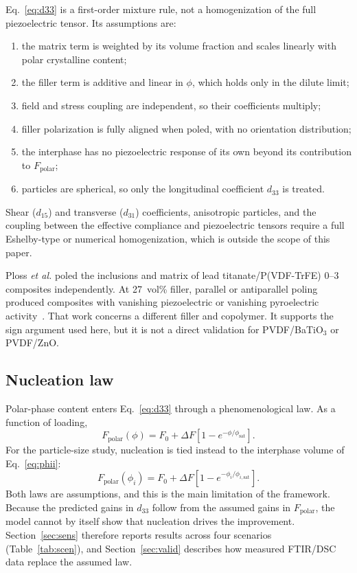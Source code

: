 \documentclass[11pt,a4paper]{article}
\newcommand{\BTO}{BaTiO$_3$}
\newcommand{\dt}{d_{33}}
\newcommand{\Fp}{F_{\mathrm{polar}}}
\begin{document}
Eq.~\eqref{eq:d33} is a first-order mixture rule, not a homogenization of the full piezoelectric tensor. Its assumptions are:
\begin{enumerate}
\item the matrix term is weighted by its volume fraction and scales linearly with polar crystalline content;
\item the filler term is additive and linear in $\phi$, which holds only in the dilute limit;
\item field and stress coupling are independent, so their coefficients multiply;
\item filler polarization is fully aligned when poled, with no orientation distribution;
\item the interphase has no piezoelectric response of its own beyond its contribution to $\Fp$;
\item particles are spherical, so only the longitudinal coefficient $\dt$ is treated.
\end{enumerate}
Shear ($d_{15}$) and transverse ($d_{31}$) coefficients, anisotropic particles, and the coupling between the effective compliance and piezoelectric tensors require a full Eshelby-type or numerical homogenization, which is outside the scope of this paper.

Ploss \emph{et al.} poled the inclusions and matrix of lead titanate/P(VDF-TrFE) 0--3 composites independently. At 27~vol\% filler, parallel or antiparallel poling produced composites with vanishing piezoelectric or vanishing pyroelectric activity~\cite{Ploss2000}. That work concerns a different filler and copolymer. It supports the sign argument used here, but it is not a direct validation for PVDF/\BTO{} or PVDF/ZnO.

\subsection{Nucleation law}\label{sec:nucl}
Polar-phase content enters Eq.~\eqref{eq:d33} through a phenomenological law. As a function of loading,
\begin{equation}
\Fp(\phi)=F_0+\Delta F\left[1-e^{-\phi/\phi_{\mathrm{sat}}}\right].
\label{eq:law}
\end{equation}
For the particle-size study, nucleation is tied instead to the interphase volume of Eq.~\eqref{eq:phii}:
\begin{equation}
\Fp(\phi_i)=F_0+\Delta F\left[1-e^{-\phi_i/\phi_{i,\mathrm{sat}}}\right].
\label{eq:lawi}
\end{equation}
Both laws are assumptions, and this is the main limitation of the framework. Because the predicted gains in $\dt$ follow from the assumed gains in $\Fp$, the model cannot by itself show that nucleation drives the improvement. Section~\ref{sec:sens} therefore reports results across four scenarios (Table~\ref{tab:scen}), and Section~\ref{sec:valid} describes how measured FTIR/DSC data replace the assumed law.
\end{document}
